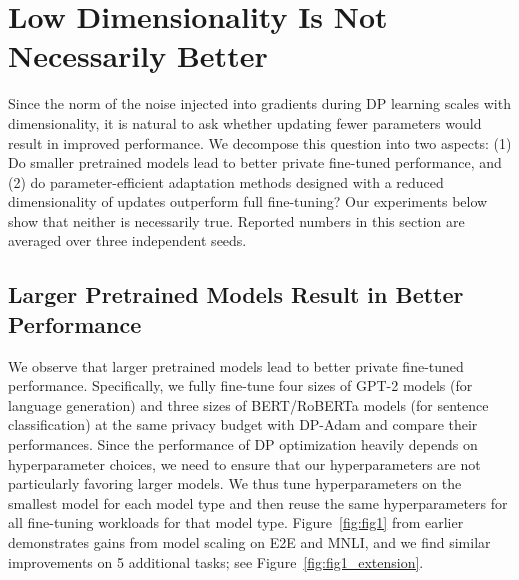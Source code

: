 \section{Low Dimensionality Is Not Necessarily Better}\label{sec:dimensionality}
Since the norm of the noise injected into gradients during DP learning scales with dimensionality, it is natural to ask whether updating fewer parameters would result in improved performance.
We decompose this question into two aspects: (1) Do smaller pretrained models lead to better private fine-tuned performance, and (2) do parameter-efficient adaptation methods designed with a reduced dimensionality of updates outperform full fine-tuning?
Our experiments below show that neither is necessarily true.
Reported numbers in this section are averaged over three independent seeds.

\subsection{Larger Pretrained Models Result in Better Performance}
We observe that larger pretrained models lead to better private fine-tuned performance. 
Specifically, we fully fine-tune four sizes of GPT-2 models (for language generation) and three sizes of BERT/RoBERTa models (for sentence classification) at the same privacy budget with DP-Adam and compare their performances. 
Since the performance of DP optimization heavily depends on hyperparameter choices, we need to ensure that our hyperparameters are not particularly favoring larger models. 
We thus tune hyperparameters on the smallest model for each model type and then reuse the same hyperparameters for all fine-tuning workloads for that model type.
Figure~\ref{fig:fig1} from earlier demonstrates gains from model scaling on E2E and MNLI, and we find similar improvements on 5 additional tasks; see Figure~\ref{fig:fig1_extension}.

